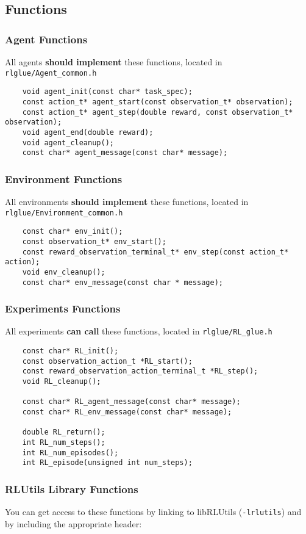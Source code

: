 \documentclass[11pt]{article}
\begin{document}
\subsection{Functions}
\subsubsection{Agent Functions}
All agents \textbf{should implement} these functions, located in \texttt{rlglue/Agent\_common.h}
\begin{verbatim}
	void agent_init(const char* task_spec);
	const action_t* agent_start(const observation_t* observation);
	const action_t* agent_step(double reward, const observation_t* observation);
	void agent_end(double reward);  
	void agent_cleanup();
	const char* agent_message(const char* message);
\end{verbatim}

\subsubsection{Environment Functions}
All environments \textbf{should implement} these functions, located in \texttt{rlglue/Environment\_common.h}
\begin{verbatim}
	const char* env_init();
	const observation_t* env_start();
	const reward_observation_terminal_t* env_step(const action_t* action);
	void env_cleanup();
	const char* env_message(const char * message);
\end{verbatim}

\subsubsection{Experiments Functions}
All experiments \textbf{can call} these functions, located in \texttt{rlglue/RL\_glue.h}
\begin{verbatim}
	const char* RL_init();
	const observation_action_t *RL_start();
	const reward_observation_action_terminal_t *RL_step();
	void RL_cleanup();

	const char* RL_agent_message(const char* message);
	const char* RL_env_message(const char* message);

	double RL_return();
	int RL_num_steps();
	int RL_num_episodes();
	int RL_episode(unsigned int num_steps);
\end{verbatim}

\subsubsection{RLUtils Library Functions}
\label{sec:util-functions}
You can get access to these functions by linking to libRLUtils (\texttt{-lrlutils}) and by including the appropriate header:
\end{document}
